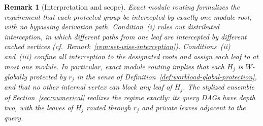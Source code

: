 \documentclass[journal]{IEEEtran}
\newtheorem{remark}{Remark}[section]
\numberwithin{equation}{section}
\begin{document}
\begin{remark}[Interpretation and scope]
\label{rem:no-spurious-interpretation}
Exact module routing formalizes the requirement that each protected group be
intercepted by exactly one module root, with no bypassing derivation path.
Condition~(i) rules out \emph{distributed interception}, in which different
paths from one leaf are intercepted by different cached vertices
(cf.~Remark~\ref{rem:set-wise-interception}).  Conditions~(ii) and~(iii)
confine all interception to the designated roots and assign each leaf to at
most one module.  In particular, exact module routing implies that each
\(H_j\) is \(W\)-globally protected by \(r_j\) in the sense of
Definition~\ref{def:workload-global-protection}, and that no other internal
vertex can block any leaf of \(H_j\).  The stylized ensemble of
Section~\ref{sec:numerical} realizes the regime exactly: its query DAGs have
depth two, with the leaves of \(H_j\) routed through \(r_j\) and private
leaves adjacent to the query.
\end{remark}
\end{document}
